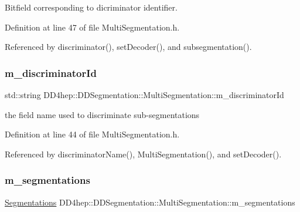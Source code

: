 Bitfield corresponding to dicriminator identifier. 



Definition at line 47 of file Multi\+Segmentation.\+h.



Referenced by discriminator(), set\+Decoder(), and subsegmentation().

\hypertarget{class_d_d4hep_1_1_d_d_segmentation_1_1_multi_segmentation_a922d7825b1c14d0724bfd1711082b943}{}\label{class_d_d4hep_1_1_d_d_segmentation_1_1_multi_segmentation_a922d7825b1c14d0724bfd1711082b943} 
\subsubsection{\texorpdfstring{m\+\_\+discriminator\+Id}{m\_discriminatorId}}
{\footnotesize\ttfamily std\+::string D\+D4hep\+::\+D\+D\+Segmentation\+::\+Multi\+Segmentation\+::m\+\_\+discriminator\+Id\hspace{0.3cm}{\ttfamily [protected]}}



the field name used to discriminate sub-\/segmentations 



Definition at line 44 of file Multi\+Segmentation.\+h.



Referenced by discriminator\+Name(), Multi\+Segmentation(), and set\+Decoder().

\hypertarget{class_d_d4hep_1_1_d_d_segmentation_1_1_multi_segmentation_a9af45d1b08e9f34c17ea27dcdf2e1019}{}\label{class_d_d4hep_1_1_d_d_segmentation_1_1_multi_segmentation_a9af45d1b08e9f34c17ea27dcdf2e1019} 
\subsubsection{\texorpdfstring{m\+\_\+segmentations}{m\_segmentations}}
{\footnotesize\ttfamily \hyperlink{class_d_d4hep_1_1_d_d_segmentation_1_1_multi_segmentation_a083ba7cc081c5c3c47cafac5980100f8}{Segmentations} D\+D4hep\+::\+D\+D\+Segmentation\+::\+Multi\+Segmentation\+::m\+\_\+segmentations\hspace{0.3cm}{\ttfamily [protected]}}



